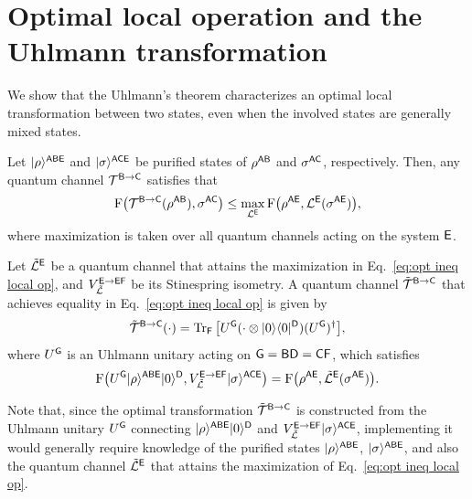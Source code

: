 \section{Optimal local operation and the Uhlmann transformation}
\label{sec:opt local and Uhlmann}


We show that the Uhlmann's theorem characterizes an optimal local transformation between two states, even when the involved states are generally mixed states.

\begin{proposition}
\label{prop:opt local mixed via Uhl}
Let $|\rho\rangle^{{\mathsf{A}}{\mathsf{B}}{\mathsf{E}}}$ and $|\sigma\rangle^{{\mathsf{A}}{\mathsf{C}}{\mathsf{E}}}$ be purified states of $\rho^{{\mathsf{A}}{\mathsf{B}}}$ and $\sigma^{{\mathsf{A}}{\mathsf{C}}}$, respectively. Then, any quantum channel ${\mathcal{T}}^{{\mathsf{B}}\rightarrow{\mathsf{C}}}$ satisfies that
    \begin{align}
    \label{eq:opt ineq local op}
        {\mathrm{F}}\big({\mathcal{T}}^{{\mathsf{B}}\rightarrow{\mathsf{C}}}(\rho^{{\mathsf{A}}{\mathsf{B}}}), \sigma^{{\mathsf{A}}{\mathsf{C}}}\big) \leq \max_{{\mathcal{L}}^{\mathsf{E}}} {\mathrm{F}}\big(\rho^{{\mathsf{A}}{\mathsf{E}}}, {\mathcal{L}}^{\mathsf{E}}(\sigma^{{\mathsf{A}}{\mathsf{E}}})\big),
    \end{align}
where maximization is taken over all quantum channels acting on the system ${\mathsf{E}}$.

Let $\tilde{{\mathcal{L}}}^{\mathsf{E}}$ be a quantum channel that attains the maximization in Eq.~\eqref{eq:opt ineq local op}, and $V_{\tilde{{\mathcal{L}}}}^{{\mathsf{E}}\rightarrow{\mathsf{E}}{\mathsf{F}}}$ be its Stinespring isometry.
A quantum channel $\tilde{{\mathcal{T}}}^{{\mathsf{B}}\rightarrow{\mathsf{C}}}$ that achieves equality in Eq.~\eqref{eq:opt ineq local op} is given by
\begin{align}
\tilde{{\mathcal{T}}}^{{\mathsf{B}}\rightarrow{\mathsf{C}}}(\cdot) = \operatorname{Tr}_{\mathsf{F}}\big[U^{\mathsf{G}}(\cdot \otimes |0\rangle\langle0|^{\mathsf{D}})(U^{\mathsf{G}})^\dag\big],
\end{align}
where $U^{\mathsf{G}}$ is an Uhlmann unitary acting on ${\mathsf{G}} = {\mathsf{B}}{\mathsf{D}} = {\mathsf{C}}{\mathsf{F}}$, which satisfies 
\begin{align}
    {\mathrm{F}}\big(U^{\mathsf{G}}|\rho\rangle^{{\mathsf{A}}{\mathsf{B}}{\mathsf{E}}}|0\rangle^{\mathsf{D}}, V_{\tilde{{\mathcal{L}}}}^{{\mathsf{E}}\rightarrow{\mathsf{E}}{\mathsf{F}}}|\sigma\rangle^{{\mathsf{A}}{\mathsf{C}}{\mathsf{E}}}\big) = {\mathrm{F}}\big(\rho^{{\mathsf{A}}{\mathsf{E}}}, \tilde{{\mathcal{L}}}^{\mathsf{E}}(\sigma^{{\mathsf{A}}{\mathsf{E}}})\big).
\end{align}
\end{proposition}




Note that, since the optimal transformation $\tilde{{\mathcal{T}}}^{{\mathsf{B}}\rightarrow{\mathsf{C}}}$ is constructed from the Uhlmann unitary $U^{\mathsf{G}}$ connecting $|\rho\rangle^{{\mathsf{A}}{\mathsf{B}}{\mathsf{E}}}|0\rangle^{\mathsf{D}}$ and $V_{\tilde{{\mathcal{L}}}}^{{\mathsf{E}}\rightarrow{\mathsf{E}}{\mathsf{F}}}|\sigma\rangle^{{\mathsf{A}}{\mathsf{C}}{\mathsf{E}}}$, implementing it would generally require knowledge of the purified states $|\rho\rangle^{{\mathsf{A}}{\mathsf{B}}{\mathsf{E}}}$, $|\sigma\rangle^{{\mathsf{A}}{\mathsf{B}}{\mathsf{E}}}$, and also the quantum channel $\tilde{{\mathcal{L}}}^{\mathsf{E}}$ that attains the maximization of Eq.~\eqref{eq:opt ineq local op}.


